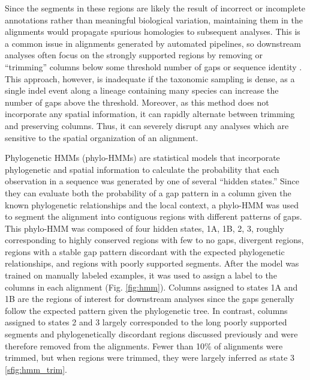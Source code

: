 \documentclass[10pt,letterpaper]{article}
\begin{document}

Since the segments in these regions are likely the result of incorrect or incomplete annotations rather than meaningful biological variation, maintaining them in the alignments would propagate spurious homologies to subsequent analyses. This is a common issue in alignments generated by automated pipelines, so downstream analyses often focus on the strongly supported regions by removing or “trimming” columns below some threshold number of gaps or sequence identity \cite{Castresana2000, CapellaGutierrez2009}. This approach, however, is inadequate if the taxonomic sampling is dense, as a single indel event along a lineage containing many species can increase the number of gaps above the threshold. Moreover, as this method does not incorporate any spatial information, it can rapidly alternate between trimming and preserving columns. Thus, it can severely disrupt any analyses which are sensitive to the spatial organization of an alignment.

Phylogenetic HMMs (phylo-HMMs) are statistical models that incorporate phylogenetic and spatial information to calculate the probability that each observation in a sequence was generated by one of several “hidden states.” Since they can evaluate both the probability of a gap pattern in a column given the known phylogenetic relationships and the local context, a phylo-HMM was used to segment the alignment into contiguous regions with different patterns of gaps. This phylo-HMM was composed of four hidden states, {1A, 1B, 2, 3}, roughly corresponding to highly conserved regions with few to no gaps, divergent regions, regions with a stable gap pattern discordant with the expected phylogenetic relationships, and regions with poorly supported segments. After the model was trained on manually labeled examples, it was used to assign a label to the columns in each alignment (Fig. \ref{fig:hmm}). Columns assigned to states 1A and 1B are the regions of interest for downstream analyses since the gaps generally follow the expected pattern given the phylogenetic tree. In contrast, columns assigned to states 2 and 3 largely corresponded to the long poorly supported segments and phylogenetically discordant regions discussed previously and were therefore removed from the alignments. Fewer than 10\% of alignments were trimmed, but when regions were trimmed, they were largely inferred as state 3 \ref{sfig:hmm_trim}.
\end{document}
